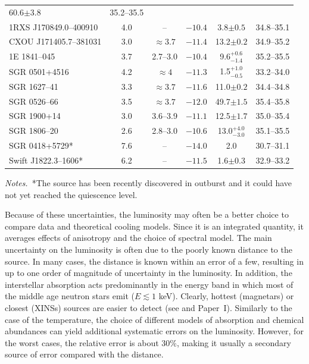 \documentclass[smallextended]{svjour3}       %
\begin{document}
\begin{table}
\begin{center}
\begin{tabular}{l c c c c c }
60.6$\pm 3.8$ &   35.2--35.5 \\
 1RXS J170849.0--400910 & 4.0 & -- & $-10.4$ &         
3.8$\pm 0.5$ &  34.8--35.1 \\
 CXOU J171405.7--381031 & 3.0 & $\approx 3.7$ & $-11.4$ &    
    13.2$\pm 0.2$ &    34.9--35.2 \\
           1E 1841--045           & 3.7 & 2.7--3.0 & $-10.4$
& 9.6$^{+ 0.6}_{- 1.4}$ &    35.2--35.5 \\
         SGR 0501+4516       & 4.2 & $\approx 4 $ & $ -11.3$
& 1.5$^{+ 1.0}_{- 0.5}$ &     33.2--34.0 \\
           SGR 1627--41         &  3.3 & $\approx 3.7 $ &
$-11.6$ &         11.0$\pm 0.2$ &   34.4--34.8 \\
           SGR 0526--66         & 3.5 & $\approx 3.7 $ & $
-12.0$ &         49.7$\pm 1.5$ &    35.4--35.8 \\
           SGR 1900+14        &  3.0 & 3.6--3.9 & $-11.1$ & 
       12.5$\pm 1.7$ &    35.0--35.4 \\
           SGR 1806--20        &  2.6 & 2.8--3.0 & $-10.6$
&13.0$^{+ 4.0}_{- 3.0}$ &     35.1--35.5 \\
         SGR 0418+5729{}* & 7.6 & -- & $-14.0$ &            
      2.0 &     30.7--31.1 \\
    Swift J1822.3--1606{}* & 6.2 & -- & $-11.5$ &         
1.6$\pm 0.3$ &    32.9--33.2 \\[.7ex]
\hline
\hline
\end{tabular}
\end{center}
\textit{Notes.}{~}*{\footnotesize The source has been recently discovered in
outburst and it could have not yet reached the quiescence level.}
\label{tab:cooling}
\end{table}

Because of these uncertainties, the luminosity may often be
a better choice to compare data and theoretical cooling
models.  Since it is an integrated quantity, it averages
effects of anisotropy and the choice of spectral model. The
main uncertainty on the luminosity is often due to the
poorly known distance to the source. In many cases, the
distance is known within an error of a few, resulting in up
to one order of magnitude of uncertainty in the luminosity.
In addition, the interstellar absorption acts predominantly
in the energy band in which most of the middle age neutron
stars emit ($E\lesssim 1$ keV). Clearly, hottest (magnetars)
or closest (XINSs) sources are easier to detect (see
\citealp{vigano13} and Paper~I). Similarly to the case of
the temperature, the choice of different models of
absorption and chemical abundances can yield additional
systematic errors on the luminosity. However, for the worst
cases, the relative error is about $30\%$, making it usually
a secondary source of error compared with the distance.
\end{document}
